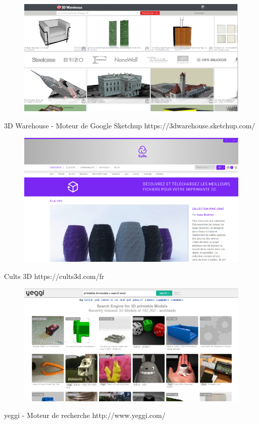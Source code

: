 \documentclass{article}
\begin{document}
\begin{figure}[h!]
\centering
\includegraphics[scale=0.3]{./images/3dwarehouse.png}
\end{figure}\hfill 
 \par\leavevmode\par
3D Warehouse - Moteur de Google Sketchup
https://3dwarehouse.sketchup.com/
\begin{figure}[h!]
\centering
\includegraphics[scale=0.3]{./images/cults.png}
\end{figure}\hfill 
 \par\leavevmode\par
Cults 3D
https://cults3d.com/fr
\begin{figure}[h!]
\centering
\includegraphics[scale=0.3]{./images/yeggi.png}
\end{figure}\hfill 
 \par\leavevmode\par
yeggi - Moteur de recherche
http://www.yeggi.com/
\end{document}
